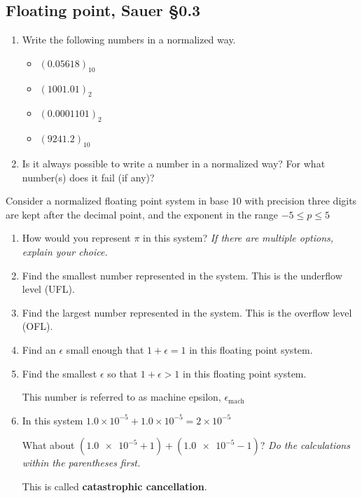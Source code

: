 \documentclass[12pt,letterpaper,noanswers]{exam}
\begin{document}
\subsection{Floating point, Sauer \S 0.3}
\begin{enumerate}[resume]
\itemsep50pt
\item Write the following numbers in a normalized way.
\begin{itemize}
\item $(0.05618)_{10}$
\item $(1001.01)_2$
\item $(0.0001101)_2$
\item $(9241.2)_{10}$
\end{itemize}

\item Is it always possible to write a number in a normalized way?  For what number(s) does it fail (if any)?
\end{enumerate}
\vspace{1in}

Consider a normalized floating point system in base $10$ with precision three digits are kept after the decimal point, and the exponent in the range $-5\leq p \leq 5$

\begin{enumerate}[resume]
\itemsep40pt
\item How would you represent $\pi$ in this system?  \emph{If there are multiple options, explain your choice.}

\item Find the smallest number represented in the system.  This is the underflow level (UFL).

\item Find the largest number represented in the system.  This is the overflow level (OFL).

\item Find an $\epsilon$ small enough that $1+\epsilon = 1$ in this floating point system.

\item Find the smallest $\epsilon$ so that $1+\epsilon > 1$ in this floating point system.

This number is referred to as machine epsilon, $\epsilon_{\text{mach}}$

\item In this system $1.0\times 10^{-5} + 1.0\times 10^{-5} = 2\times 10^{-5}$ 

What about $(\num{1.0e-5} + 1) + (\num{1.0e-5}-1)$?  \emph{Do the calculations within the parentheses first.}

This is called \textbf{catastrophic cancellation}.
\end{enumerate}
\end{document}
